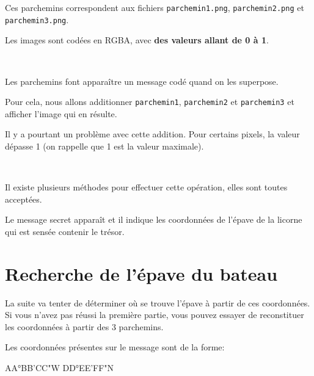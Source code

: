 Ces parchemins correspondent aux fichiers \verb?parchemin1.png?, \verb?parchemin2.png? et \verb?parchemin3.png?.

Les images sont codées en RGBA, avec \textbf{des valeurs allant de 0 à 1}.


\newpage


~\

Les parchemins font apparaître un message codé quand on les superpose.

Pour cela, nous allons additionner \verb?parchemin1?, \verb?parchemin2? et \verb?parchemin3? et afficher l'image qui en résulte.

Il y a pourtant un problème avec cette addition. Pour certains pixels, la valeur dépasse 1 (on rappelle que 1 est la valeur maximale).


~\

Il existe plusieurs méthodes pour effectuer cette opération, elles sont toutes acceptées.

Le message secret apparaît et il indique les coordonnées de l'épave de la licorne qui est sensée contenir le trésor.

\section{Recherche de l'épave du bateau}

La suite va tenter de déterminer où se trouve l'épave à partir de ces coordonnées. Si vous n'avez pas réussi la première partie, vous pouvez essayer de reconstituer les coordonnées à partir des 3 parchemins.

Les coordonnées présentes sur le message sont de la forme:
\begin{center}
AA°BB'CC"W DD°EE'FF"N
\end{center}

